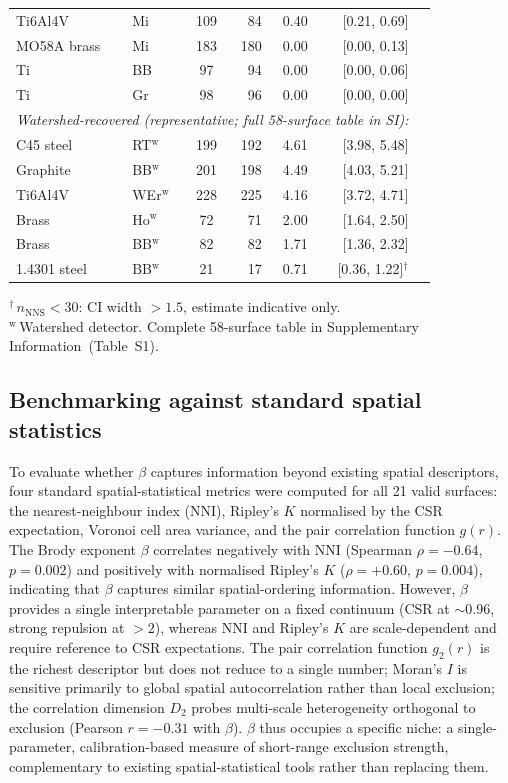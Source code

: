 \documentclass[final,1p,times]{elsarticle}
\theoremstyle{definition}
\begin{document}
\begin{table}[htbp]
\begin{tabular}{@{}llcrrrc@{}}
    Ti6Al4V & Mi & 109 & 84 & 0.40 & [0.21, 0.69] \\
    MO58A brass & Mi & 183 & 180 & 0.00 & [0.00, 0.13] \\
    Ti & BB & 97 & 94 & 0.00 & [0.00, 0.06] \\
    Ti & Gr & 98 & 96 & 0.00 & [0.00, 0.00] \\
    \midrule
    \multicolumn{6}{l}{\footnotesize\textit{Watershed-recovered (representative; full 58-surface table in SI):}} \\
    C45 steel & RT$^{\text{w}}$ & 199 & 192 & 4.61 & [3.98, 5.48] \\
    Graphite & BB$^{\text{w}}$ & 201 & 198 & 4.49 & [4.03, 5.21] \\
    Ti6Al4V & WEr$^{\text{w}}$ & 228 & 225 & 4.16 & [3.72, 4.71] \\
    Brass & Ho$^{\text{w}}$ & 72 & 71 & 2.00 & [1.64, 2.50] \\
    Brass & BB$^{\text{w}}$ & 82 & 82 & 1.71 & [1.36, 2.32] \\
    1.4301 steel & BB$^{\text{w}}$ & 21 & 17 & 0.71 & [0.36, 1.22]$^{\dagger}$ \\
    \bottomrule
  \end{tabular}

  \medskip
  {\footnotesize $^{\dagger}$\,$n_{\text{NNS}} < 30$: CI width $>1.5$, estimate indicative only. \\
  $^{\text{w}}$\,Watershed detector. Complete 58-surface table in Supplementary Information~(Table~S1).}
\end{table}

\subsection{Benchmarking against standard spatial statistics}

To evaluate whether $\beta$ captures information beyond
existing spatial descriptors, four standard spatial-statistical
metrics were computed for all 21 valid surfaces: the
nearest-neighbour index (NNI), Ripley's $K$ normalised by
the CSR expectation, Voronoi cell area variance, and the pair
correlation function $g(r)$. The Brody
exponent $\beta$ correlates negatively with NNI (Spearman
$\rho = -0.64$, $p = 0.002$) and positively with normalised
Ripley's $K$ ($\rho = +0.60$, $p = 0.004$), indicating that
$\beta$ captures similar spatial-ordering information.
However, $\beta$ provides a single interpretable parameter on a
fixed continuum (CSR at $\sim$0.96, strong repulsion at $>2$),
whereas NNI and Ripley's $K$ are scale-dependent and require
reference to CSR expectations. The pair correlation function
$g_2(r)$ is the richest descriptor but does not reduce to a single
number; Moran's $I$ is sensitive primarily to global spatial
autocorrelation rather than local exclusion; the correlation
dimension $D_2$ probes multi-scale heterogeneity orthogonal to
exclusion (Pearson $r = -0.31$ with $\beta$). $\beta$ thus
occupies a specific niche: a single-parameter, calibration-based
measure of short-range exclusion strength, complementary to
existing spatial-statistical tools rather than replacing them.
\end{document}
